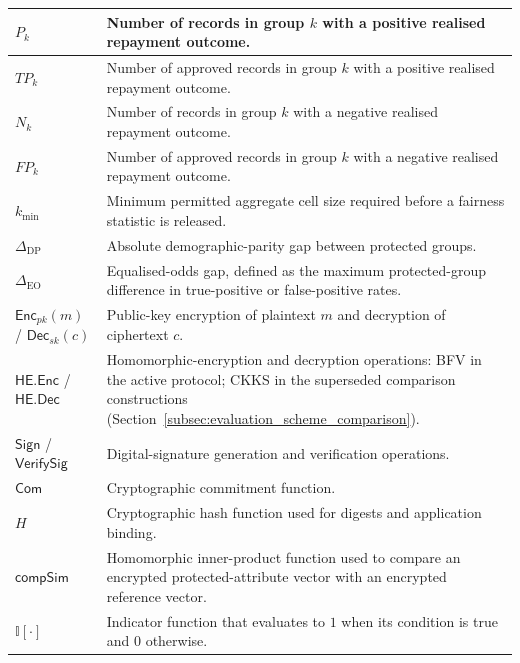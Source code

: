 \documentclass[a4paper,fleqn]{cas-dc}
\begin{document}
\begin{table}[htbp]
\begin{tabular}{|p{2.6cm}|p{11.4cm}|}
$P_k$
& Number of records in group $k$ with a positive realised repayment outcome. \\
\hline

$TP_k$
& Number of approved records in group $k$ with a positive realised repayment outcome. \\
\hline

$N_k$
& Number of records in group $k$ with a negative realised repayment outcome. \\
\hline

$FP_k$
& Number of approved records in group $k$ with a negative realised repayment outcome. \\
\hline

$k_{\min}$
& Minimum permitted aggregate cell size required before a fairness statistic is released. \\
\hline

$\Delta_{\mathrm{DP}}$
& Absolute demographic-parity gap between protected groups. \\
\hline

$\Delta_{\mathrm{EO}}$
& Equalised-odds gap, defined as the maximum protected-group difference in true-positive or false-positive rates. \\
\hline

$\mathsf{Enc}_{pk}(m)$ / $\mathsf{Dec}_{sk}(c)$
& Public-key encryption of plaintext $m$ and decryption of ciphertext $c$. \\
\hline

$\mathsf{HE.Enc}$ / $\mathsf{HE.Dec}$
& Homomorphic-encryption and decryption operations: BFV in the active protocol; CKKS in the superseded comparison constructions (Section~\ref{subsec:evaluation_scheme_comparison}). \\
\hline

$\mathsf{Sign}$ / $\mathsf{VerifySig}$
& Digital-signature generation and verification operations. \\
\hline

$\mathsf{Com}$
& Cryptographic commitment function. \\
\hline

$H$
& Cryptographic hash function used for digests and application binding. \\
\hline

$\textsf{compSim}$
& Homomorphic inner-product function used to compare an encrypted protected-attribute vector with an encrypted reference vector. \\
\hline

$\mathbb{I}[\cdot]$
& Indicator function that evaluates to $1$ when its condition is true and $0$ otherwise. \\
\hline

\end{tabular}
\end{table}
\end{document}

